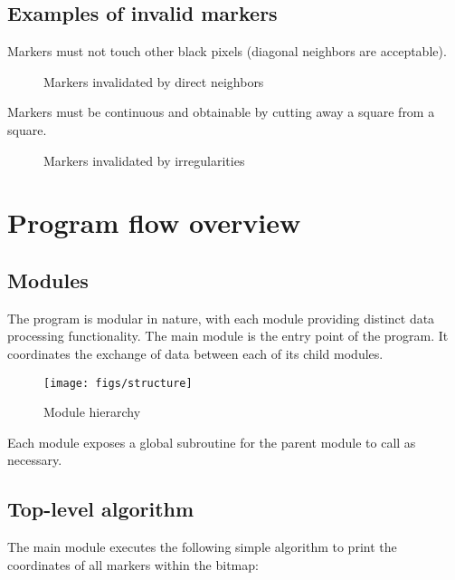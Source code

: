 \documentclass{article}
\begin{document}
	\subsection{Examples of invalid markers}
	
	Markers must not touch other black pixels (diagonal neighbors are
	acceptable).
	
	\begin{figure}[h]
		\centering
		\caption{Markers invalidated by direct neighbors}
	\end{figure}
	
	Markers must be continuous and obtainable by cutting away a square from a
	square.
	
	\begin{figure}[h]
		\centering
		\caption{Markers invalidated by irregularities}
	\end{figure}
	
	\newpage
	\section{Program flow overview}
	
	\subsection{Modules}
	
	The program is modular in nature, with each module providing distinct data
	processing functionality. The main module is the entry point of the program.
	It coordinates the exchange of data between each of its child modules.
	
	\begin{figure}[h]
		\centering
		\texttt{[image: figs/structure]}
		\caption{Module hierarchy}
	\end{figure}
	
	Each module exposes a global subroutine for the parent module to call as
	necessary.
	
	\subsection{Top-level algorithm}
	\label{sec:topalg}
	
	The main module executes the following simple algorithm to print the
	coordinates of all markers within the bitmap:
	
\end{document}
